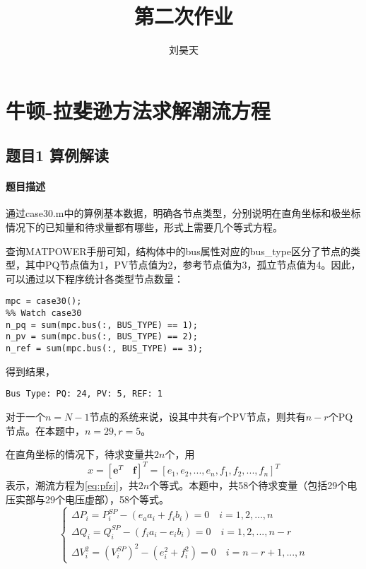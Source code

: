 \documentclass[a4paper,12pt]{article}
\title{第二次作业}
\author{刘昊天}
\newcommand{\vect}[1]{\boldsymbol{#1}}
\begin{document}
    \maketitle
    \section{牛顿-拉斐逊方法求解潮流方程}
    \subsection{题目1 算例解读}
    \paragraph{题目描述} 通过case30.m中的算例基本数据，明确各节点类型，分别说明在直角坐标和极坐标情况下的已知量和待求量都有哪些，形式上需要几个等式方程。

    查询MATPOWER手册\cite{manual}可知，结构体中的bus属性对应的bus\_type区分了节点的类型，其中PQ节点值为1，PV节点值为2，参考节点值为3，孤立节点值为4。因此，可以通过以下程序统计各类型节点数量：

    \begin{lstlisting}[style=Matlab-editor,basicstyle=\mlttfamily]
mpc = case30();
%% Watch case30
n_pq = sum(mpc.bus(:, BUS_TYPE) == 1);
n_pv = sum(mpc.bus(:, BUS_TYPE) == 2);
n_ref = sum(mpc.bus(:, BUS_TYPE) == 3);
    \end{lstlisting}
    得到结果，
    \begin{lstlisting}
Bus Type: PQ: 24, PV: 5, REF: 1
    \end{lstlisting}

    对于一个$n=N-1$节点的系统来说，设其中共有$r$个PV节点，则共有$n-r$个PQ节点。在本题中，$n=29,r=5$。

    在直角坐标的情况下，待求变量共$2n$个，用
    $$x=[\vect{e}^T \quad \vect{f}]^T=[e_1,e_2,...,e_n,f_1,f_2,...,f_n]^T$$ 表示，潮流方程为\cref{eq:pfzj}，共$2n$个等式。本题中，共58个待求变量（包括29个电压实部与29个电压虚部），58个等式。
    \begin{equation}
      \label{eq:pfzj}
      \begin{cases}
        \Delta P_i = P^{SP}_i-(e_a a_i+ f_i b_i) = 0 \quad i=1,2,...,n\\
        \Delta Q_i = Q^{SP}_i - (f_i a_i - e_i b_i) = 0 \quad i = 1,2,...,n-r\\
        \Delta V_i^2 = (V_i^{SP})^2-(e_i^2+f_i^2)=0 \quad i=n-r+1,...,n
      \end{cases}
    \end{equation}
\end{document}
